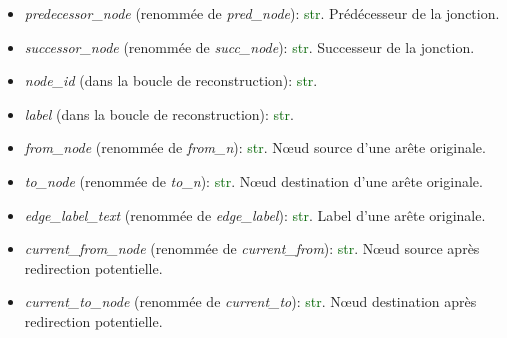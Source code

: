 \documentclass[11pt,a4paper]{article}
\newcommand{\var}[1]{\textit{#1}}
\newcommand{\vartype}[1]{\textcolor{darkgreen}{#1}}
\begin{document}
\begin{description}
\begin{itemize}
        \item \var{predecessor\_node} (renommée de \var{pred\_node}): \vartype{str}. Prédécesseur de la jonction.
        \item \var{successor\_node} (renommée de \var{succ\_node}): \vartype{str}. Successeur de la jonction.
        \item \var{node\_id} (dans la boucle de reconstruction): \vartype{str}.
        \item \var{label} (dans la boucle de reconstruction): \vartype{str}.
        \item \var{from\_node} (renommée de \var{from\_n}): \vartype{str}. Nœud source d'une arête originale.
        \item \var{to\_node} (renommée de \var{to\_n}): \vartype{str}. Nœud destination d'une arête originale.
        \item \var{edge\_label\_text} (renommée de \var{edge\_label}): \vartype{str}. Label d'une arête originale.
        \item \var{current\_from\_node} (renommée de \var{current\_from}): \vartype{str}. Nœud source après redirection potentielle.
        \item \var{current\_to\_node} (renommée de \var{current\_to}): \vartype{str}. Nœud destination après redirection potentielle.
    \end{itemize}
\end{description}
\end{document}
